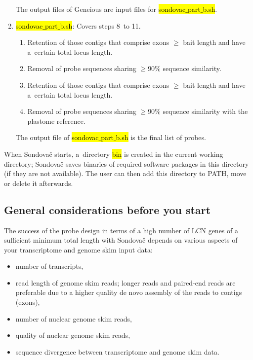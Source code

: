 \documentclass[a4paper, 11pt, twoside]{article}
\renewcommand{\texttt}[1]{\hl{\ttfamily #1}}
\begin{document}
\begin{enumerate}[label=\textbf{\Alph*.}]
  The output files of Geneious are input files for \texttt{sondovac$\_$part$\_$b.sh}.

  \item \texttt{sondovac$\_$part$\_$b.sh}: Covers steps 8~to 11.
    \begin{enumerate}[label=\textbf{\arabic*.}, resume]
      \item Retention of those contigs that comprise exons $\geq$ bait length and have a~certain total locus length.
      \item Removal of probe sequences sharing $\geq$90\% sequence similarity.
      \item Retention of those contigs that comprise exons $\geq$ bait length and have a~certain total locus length.
      \item Removal of probe sequences sharing $\geq$90\% sequence similarity with the plastome reference.
    \end{enumerate}

  The output file of \texttt{sondovac$\_$part$\_$b.sh} is the final list of probes.

\end{enumerate}

When Sondovač starts, a~directory \texttt{bin} is created in the current working directory; Sondovač saves binaries of required software packages in this directory (if they are not available). The user can then add this directory to PATH, move or delete it afterwards.

\subsection{General considerations before you start}

The success of the probe design in terms of a high number of LCN genes of a sufficient minimum total length with Sondovač depends on various aspects of your transcriptome and genome skim input data:
\begin{itemize}
  \item number of transcripts,
  \item read length of genome skim reads; longer reads and paired-end reads are preferable due to a higher 	quality de novo assembly of the reads to contigs (exons),
  \item number of nuclear genome skim reads,
  \item quality of nuclear genome skim reads,
  \item sequence divergence between transcriptome and genome skim data.
\end{itemize}
\end{document}

